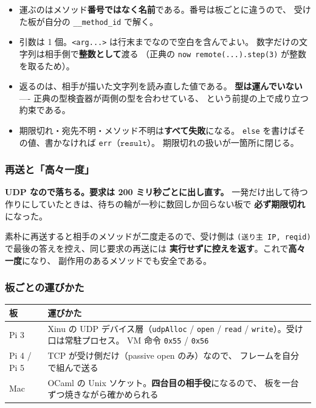 \documentclass[11pt,a4paper]{ltjsarticle}
\newcommand{\ty}[1]{\ensuremath{\mathtt{#1}}}
\begin{document}
\begin{itemize}
\item 運ぶのはメソッド\textbf{番号ではなく名前}である。番号は板ごとに違うので、
  受けた板が自分の \texttt{\_\_method\_id} で解く。
\item 引数は 1 個。\texttt{<arg...>} は行末までなので空白を含んでよい。
  数字だけの文字列は相手側で\textbf{整数として}渡る
  （正典の \texttt{now remote(...).step(3)} が整数を取るため）。
\item 返るのは、相手が描いた文字列を読み直した値である。
  \textbf{型は運んでいない} ---- 正典の型検査器が両側の型を合わせている、
  という前提の上で成り立つ約束である。
\item 期限切れ・宛先不明・メソッド不明は\textbf{すべて失敗}になる。
  \texttt{else} を書けばその値、書かなければ \texttt{err}（\ty{result}）。
  期限切れの扱いが一箇所に閉じる。
\end{itemize}

\subsubsection*{再送と「高々一度」}

\textbf{UDP なので落ちる。要求は 200 ミリ秒ごとに出し直す。}
一発だけ出して待つ作りにしていたときは、待ちの輪が一秒に数回しか回らない板で
\textbf{必ず期限切れ}になった。

素朴に再送すると相手のメソッドが二度走るので、受け側は
\texttt{(送り主 IP, reqid)} で最後の答えを控え、同じ要求の再送には
\textbf{実行せずに控えを返す}。これで\textbf{高々一度}になり、
副作用のあるメソッドでも安全である。

\subsubsection*{板ごとの運びかた}

\begin{center}
\small
\begin{tabular}{@{}lp{8.4cm}@{}}
\toprule
板 & 運びかた \\
\midrule
Pi 3 & Xinu の UDP デバイス層（\texttt{udpAlloc} / \texttt{open} /
       \texttt{read} / \texttt{write}）。受け口は常駐プロセス。
       VM 命令 \texttt{0x55} / \texttt{0x56} \\
Pi 4 / Pi 5 & TCP が受け側だけ（passive open のみ）なので、
       フレームを自分で組んで送る \\
Mac & OCaml の Unix ソケット。\textbf{四台目の相手役}になるので、
       板を一台ずつ焼きながら確かめられる \\
\bottomrule
\end{tabular}
\end{center}
\end{document}
